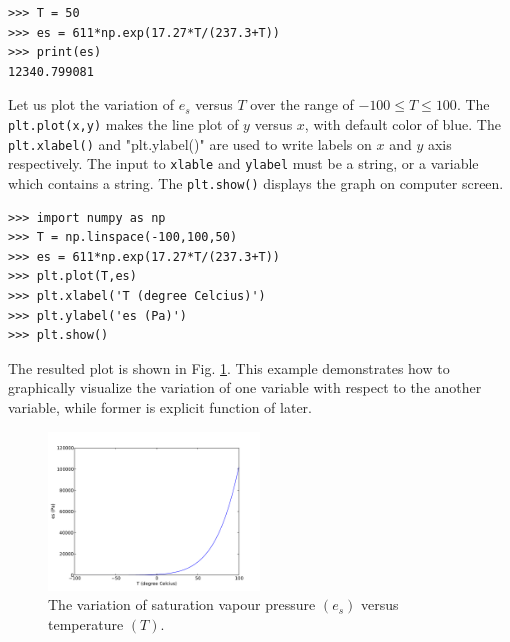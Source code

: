 \documentclass[10pt]{book}
\begin{document}
{\beforeverb
\begin{verbatim}
>>> T = 50
>>> es = 611*np.exp(17.27*T/(237.3+T))
>>> print(es)
12340.799081
\end{verbatim}
\afterverb
{}

Let us plot the variation of $e_s$ versus $T$ over the range of $-100 \leq T \leq 100$. The \verb"plt.plot(x,y)" makes the line plot of $y$ versus $x$, with default color of blue. The \verb"plt.xlabel()" and \value"plt.ylabel()" are used to write labels on $x$ and $y$ axis respectively. The input to \verb"xlable" and \verb"ylabel" must be a string, or a variable which contains a string. The \verb"plt.show()" displays the graph on computer screen. 
\beforeverb
\begin{verbatim}
>>> import numpy as np
>>> T = np.linspace(-100,100,50)
>>> es = 611*np.exp(17.27*T/(237.3+T))
>>> plt.plot(T,es)
>>> plt.xlabel('T (degree Celcius)')
>>> plt.ylabel('es (Pa)')
>>> plt.show()
\end{verbatim}
\afterverb
The resulted plot is shown in Fig. \ref{fig:es_t}. This example demonstrates how to graphically visualize the variation of one variable with respect to the another variable, while former is explicit function of later.

\beforefig
\begin{figure}[h!]
  \centering
    \includegraphics[width=0.5\textwidth]{images/es_t.pdf}
  \caption{The variation of saturation vapour pressure $(e_s)$ versus temperature $(T)$. }
  \label{fig:es_t}
\end{figure}
\afterfig

}
\end{document}
